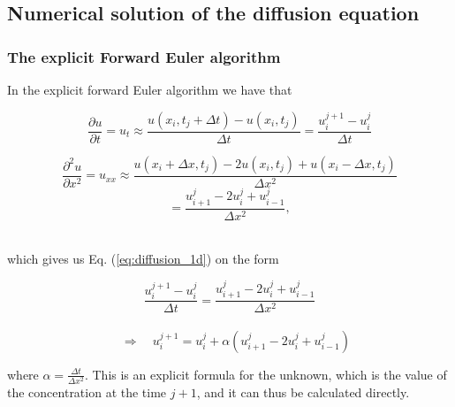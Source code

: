 \documentclass[12pt]{article}
\begin{document}
\begin{flushleft}
\subsection{Numerical solution of the diffusion equation}
\subsubsection{The explicit Forward Euler algorithm}
In the explicit forward Euler algorithm we have that
 
\vspace{5mm}
\begin{equation}\label{eq:forwrd_Euler_time}
\frac{\partial u}{\partial t} = u_t\approx \frac{u(x_i,t_j+\Delta t)-u(x_i,t_j)}{\Delta t} = \frac{u_i^{j+1}-u_i^j}{\Delta t} 
\end{equation}

\vspace{5mm}
\begin{equation}\label{eq:forwrd_Euler_space}
\frac{\partial^2 u}{\partial x^2} =u_{xx}\approx \frac{u(x_i+\Delta x,t_j)-2u(x_i,t_j)+u(x_i-\Delta x,t_j)}{\Delta x^2}
\end{equation}
\vspace{5mm}
$$ = \frac{u_{i+1}^j-2u_i^j+u_{i-1}^j}{\Delta x^2},$$\\
\vspace{5mm}

which gives us Eq. (\ref{eq:diffusion_1d}) on the form

\vspace{5mm}
$$\frac{u_i^{j+1}-u_i^j}{\Delta t} = \frac{u_{i+1}^j-2u_i^j+u_{i-1}^j}{\Delta x^2}$$\\
\vspace{5mm}
\begin{equation}\label{eq:explicit_Euler_unknown}
\quad\Rightarrow\quad u_i^{j+1} = u_i^j + \alpha\left(u_{i+1}^j -2u_i^j+u_{i-1}^j\right)
\end{equation}
\vspace{5mm}

where $\alpha = \frac{\Delta t}{\Delta x^2}$. This is an explicit formula for the unknown, which is the value of the concentration at the time $j+1$, and it can thus be calculated directly.


\end{flushleft}
\end{document}
